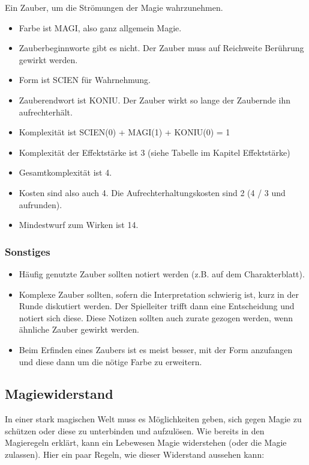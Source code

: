 \documentclass{article}
\begin{document}
Ein Zauber, um die Strömungen der Magie wahrzunehmen.

\begin{itemize}
\item Farbe ist MAGI, also ganz allgemein Magie.
\item Zauberbeginnworte gibt es nicht. Der Zauber muss auf Reichweite Berührung gewirkt werden.
\item Form ist SCIEN für Wahrnehmung.
\item Zauberendwort ist KONIU. Der Zauber wirkt so lange der Zaubernde ihn aufrechterhält.
\item Komplexität ist SCIEN(0) + MAGI(1) + KONIU(0) = 1
\item Komplexität der Effektstärke ist 3 (siehe Tabelle im Kapitel Effektstärke)
\item Gesamtkomplexität ist 4.
\item Kosten sind also auch 4. Die Aufrechterhaltungskosten sind 2 (4 / 3 und aufrunden).
\item Mindestwurf zum Wirken ist 14.
\end{itemize}

\subsubsection{Sonstiges}

\begin{itemize}
\item Häufig genutzte Zauber sollten notiert werden (z.B. auf dem Charakterblatt).
\item Komplexe Zauber sollten, sofern die Interpretation schwierig ist, kurz in der Runde diskutiert werden. Der Spielleiter trifft dann eine Entscheidung und notiert sich diese. Diese Notizen sollten auch zurate gezogen werden, wenn ähnliche Zauber gewirkt werden.
\item Beim Erfinden eines Zaubers ist es meist besser, mit der Form anzufangen und diese dann um die nötige Farbe zu erweitern.
\end{itemize}

\begin{center}
\subsection{Magiewiderstand}
\end{center}

In einer stark magischen Welt muss es Möglichkeiten geben, sich gegen Magie zu schützen oder diese zu unterbinden und
aufzulösen. Wie bereits in den Magieregeln erklärt, kann ein Lebewesen Magie widerstehen (oder die Magie zulassen).
Hier ein paar Regeln, wie dieser Widerstand aussehen kann:
\end{document}
